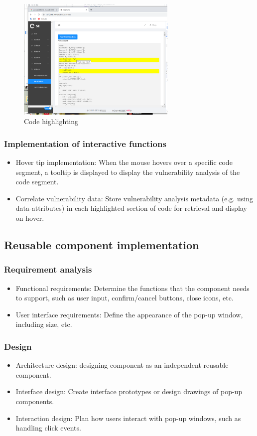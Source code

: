\documentclass[journal]{IEEEtran}
\begin{document}
\begin{figure}[!t]
  \centering
  \includegraphics[width=3in]{figures/highlightcode.png}
  \caption{Code highlighting}
  \label{fig:highlightcode}
  \end{figure}

\subsubsection{Implementation of interactive functions}
\begin{itemize}
  \item Hover tip implementation: When the mouse hovers over a specific code segment, a tooltip is displayed to display the vulnerability analysis of the code segment.
  \item Correlate vulnerability data: Store vulnerability analysis metadata (e.g. using data-attributes) in each highlighted section of code for retrieval and display on hover.
\end{itemize}


\subsection{Reusable component implementation}
\subsubsection{Requirement analysis}
\begin{itemize}
  \item Functional requirements: Determine the functions that the component needs to support, such as user input, confirm/cancel buttons, close icons, etc.
  \item User interface requirements: Define the appearance of the pop-up window, including size, etc.
\end{itemize}

\subsubsection{Design}
\begin{itemize}
  \item Architecture design: designing component as an independent reusable component.
  \item Interface design: Create interface prototypes or design drawings of pop-up components.
  \item Interaction design: Plan how users interact with pop-up windows, such as handling click events.
\end{itemize}
\end{document}
